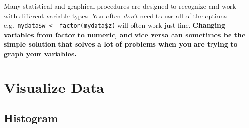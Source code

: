 \documentclass[
  letterpaper,
  DIV=11,
  numbers=noendperiod]{scrreprt}
\newenvironment{Shaded}{\begin{snugshade}}{\end{snugshade}}
\newcommand{\AttributeTok}[1]{\textcolor[rgb]{0.40,0.45,0.13}{#1}}
\newcommand{\CommentTok}[1]{\textcolor[rgb]{0.37,0.37,0.37}{#1}}
\newcommand{\ConstantTok}[1]{\textcolor[rgb]{0.56,0.35,0.01}{#1}}
\newcommand{\DecValTok}[1]{\textcolor[rgb]{0.68,0.00,0.00}{#1}}
\newcommand{\FunctionTok}[1]{\textcolor[rgb]{0.28,0.35,0.67}{#1}}
\newcommand{\NormalTok}[1]{\textcolor[rgb]{0.00,0.23,0.31}{#1}}
\newcommand{\OtherTok}[1]{\textcolor[rgb]{0.00,0.23,0.31}{#1}}
\newcommand{\SpecialCharTok}[1]{\textcolor[rgb]{0.37,0.37,0.37}{#1}}
\newcommand{\StringTok}[1]{\textcolor[rgb]{0.13,0.47,0.30}{#1}}
\begin{document}
Many statistical and graphical procedures are designed to recognize and
work with different variable types. You often \emph{don't} need to use
all of the options.
e.g.~\texttt{mydata\$w\ \textless{}-\ factor(mydata\$z)} will often work
just fine. \textbf{Changing variables from factor to numeric, and vice
versa can sometimes be the simple solution that solves a lot of problems
when you are trying to graph your variables.}

\begin{Shaded}
\end{Shaded}

\hypertarget{visualize-data}{%
\section{Visualize Data}\label{visualize-data}}

\hypertarget{histogram}{%
\subsection{Histogram}\label{histogram}}

\begin{Shaded}
\end{Shaded}
\end{document}
